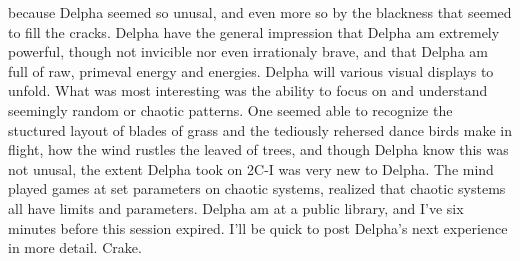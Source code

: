 \documentclass[12pt]{book}
\begin{document}
because Delpha seemed so unusal, and even more so by the blackness that seemed to fill the cracks. Delpha have the general impression that Delpha am extremely powerful, though not invicible nor even irrationaly brave, and that Delpha am full of raw, primeval energy and energies. Delpha will various visual displays to unfold. What was most interesting was the ability to focus on and understand seemingly random or chaotic patterns. One seemed able to recognize the stuctured layout of blades of grass and the tediously rehersed dance birds make in flight, how the wind rustles the leaved of trees, and though Delpha know this was not unusal, the extent Delpha took on 2C-I was very new to Delpha. The mind played games at set parameters on chaotic systems, realized that chaotic systems all have limits and parameters. Delpha am at a public library, and I've six minutes before this session expired. I'll be quick to post Delpha's next experience in more detail. Crake.
\end{document}
